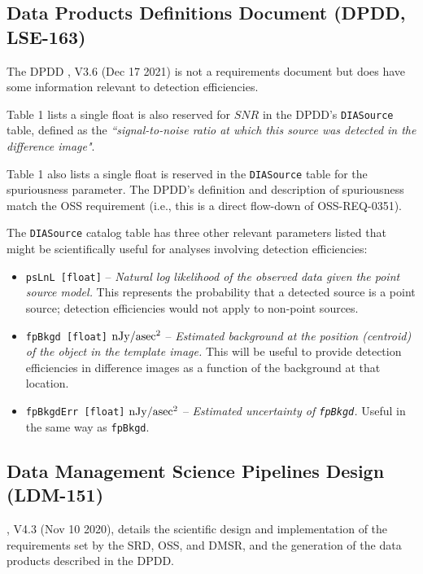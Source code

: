 \subsection{Data Products Definitions Document (DPDD, LSE-163)}\label{ssec:docs_dpdd}

The DPDD , V3.6 (Dec 17 2021) is not a requirements document but does have some information relevant to detection efficiencies.

Table 1 lists a single float is also reserved for ${SNR}$ in the DPDD's {\tt DIASource} table, defined as the {\it ``signal-to-noise ratio at which this source was detected in the difference image"}.

Table 1 also lists a single float is reserved in the {\tt DIASource} table for the spuriousness parameter.
The DPDD's definition and description of spuriousness match the OSS requirement (i.e., this is a direct flow-down of OSS-REQ-0351).

The {\tt DIASource} catalog table has three other relevant parameters listed that might be scientifically useful for analyses involving detection efficiencies:
\begin{itemize}
\item {\tt psLnL [float]} -- {\it Natural log likelihood of the observed data given the point source model.} This represents the probability that a detected source is a point source; detection efficiencies would not apply to non-point sources.
\item {\tt fpBkgd [float]} $\rm nJy/asec^2$ -- {\it Estimated background at the position (centroid) of the object in the template image.} This will be useful to provide detection efficiencies in difference images as a function of the background at that location.
\item {\tt fpBkgdErr [float]} $\rm nJy/asec^2$ -- {\it Estimated uncertainty of {\tt fpBkgd}.} Useful in the same way as {\tt fpBkgd}. 
\end{itemize}


\subsection{Data Management Science Pipelines Design (LDM-151)}\label{ssec:docs_ldm151}

, V4.3 (Nov 10 2020), details the scientific design and implementation of the requirements set by the SRD, OSS, and DMSR, and the generation of the data products described in the DPDD.

